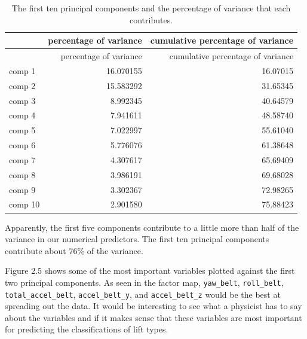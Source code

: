 \documentclass[12pt,twoside]{reedthesis}
\begin{document}
  \begin{longtable}[c]{@{}lrr@{}}
  \caption{The first ten principal components and the percentage of
  variance that each contributes.}\tabularnewline
  \toprule
  & percentage of variance & cumulative percentage of
  variance\tabularnewline
  \midrule
  \endfirsthead
  \toprule
  & percentage of variance & cumulative percentage of
  variance\tabularnewline
  \midrule
  \endhead
  comp 1 & 16.070155 & 16.07015\tabularnewline
  comp 2 & 15.583292 & 31.65345\tabularnewline
  comp 3 & 8.992345 & 40.64579\tabularnewline
  comp 4 & 7.941611 & 48.58740\tabularnewline
  comp 5 & 7.022997 & 55.61040\tabularnewline
  comp 6 & 5.776076 & 61.38648\tabularnewline
  comp 7 & 4.307617 & 65.69409\tabularnewline
  comp 8 & 3.986191 & 69.68028\tabularnewline
  comp 9 & 3.302367 & 72.98265\tabularnewline
  comp 10 & 2.901580 & 75.88423\tabularnewline
  \bottomrule
  \end{longtable}
  
  Apparently, the first five components contribute to a little more than
  half of the variance in our numerical predictors. The first ten
  principal components contribute about 76\% of the variance.
  
  Figure 2.5 shows some of the most important variables plotted against
  the first two principal components. As seen in the factor map,
  \texttt{yaw\_belt}, \texttt{roll\_belt}, \texttt{total\_accel\_belt},
  \texttt{accel\_belt\_y}, and \texttt{accel\_belt\_z} would be the best
  at spreading out the data. It would be interesting to see what a
  physicist has to say about the variables and if it makes sense that
  these variables are most important for predicting the classifications of
  lift types.
  
  \newpage
  
  \begin{Shaded}
  \begin{Highlighting}[]
   \NormalTok{, } \NormalTok{)}
  \end{Highlighting}
  \end{Shaded}
  
\end{document}
